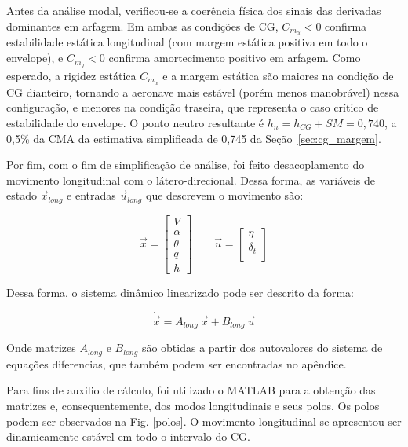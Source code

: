 Antes da análise modal, verificou-se a coerência física dos sinais das derivadas dominantes em arfagem. Em ambas as condições de CG, $C_{m_\alpha} < 0$ confirma estabilidade estática longitudinal (com margem estática positiva em todo o envelope), e $C_{m_q} < 0$ confirma amortecimento positivo em arfagem. Como esperado, a rigidez estática $C_{m_\alpha}$ e a margem estática são maiores na condição de CG dianteiro, tornando a aeronave mais estável (porém menos manobrável) nessa configuração, e menores na condição traseira, que representa o caso crítico de estabilidade do envelope. O ponto neutro resultante é $h_n = h_{CG} + SM = 0{,}740$, a 0,5\% da CMA da estimativa simplificada de 0,745 da Seção~\ref{sec:cg_margem}.

Por fim, com o fim de simplificação de análise, foi feito desacoplamento do movimento longitudinal com o látero-direcional. Dessa forma, as variáveis de estado $\vec{x}_{long}$ e entradas $\vec{u}_{long}$ que descrevem o movimento são:

\begin{equation}
    \vec{x} = \begin{bmatrix} V \\ \alpha \\ \theta \\ q \\ h   \end{bmatrix} \qquad \vec{u} = \begin{bmatrix}
        \eta \\ \delta_t \\
    \end{bmatrix}
\end{equation}

Dessa forma, o sistema dinâmico linearizado pode ser descrito da forma:

\begin{equation}
\dot{\vec{x}} = A_{long} \ \vec{x} + B_{long} \ \vec{u}
\end{equation}

Onde matrizes $A_{long}$ e $B_{long}$ são obtidas a partir dos autovalores do sistema de equações diferencias, que também podem ser encontradas no apêndice.

Para fins de auxilio de cálculo, foi utilizado o MATLAB para a obtenção das matrizes e, consequentemente, dos modos longitudinais e seus polos. Os polos podem ser observados na Fig. \ref{polos}. O movimento longitudinal se apresentou ser dinamicamente estável em todo o intervalo do CG.

